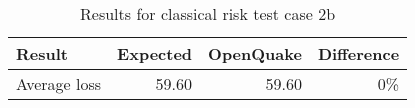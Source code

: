 \begin{table}[htbp]

\centering
\begin{tabular}{ l r r r }

\hline
\rowcolor{anti-flashwhite}
\bf{Result} & \bf{Expected} & \bf{OpenQuake} & \bf{Difference}\\
\hline
Average loss & 59.60 & 59.60 & 0\% \\
\hline
\end{tabular}

\caption{Results for classical risk test case 2b}
\label{tab:result-classical-risk-2b}
\end{table}